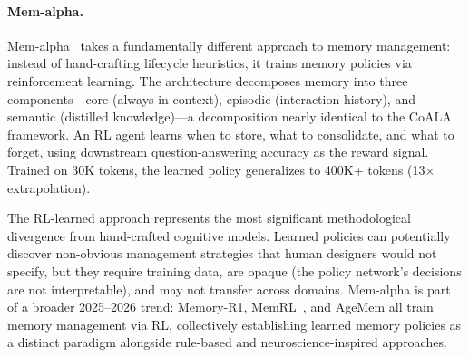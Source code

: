\paragraph{Mem-alpha.}
Mem-alpha~\cite{wang2025memalpha} takes a fundamentally different
approach to memory management: instead of hand-crafting lifecycle
heuristics, it trains memory policies via reinforcement learning.
The architecture decomposes memory into three components---core
(always in context), episodic (interaction history), and semantic
(distilled knowledge)---a decomposition nearly identical to the CoALA
framework. An RL agent learns when to store, what to consolidate,
and what to forget, using downstream question-answering accuracy as
the reward signal. Trained on 30K tokens, the learned policy
generalizes to 400K+ tokens (13$\times$ extrapolation).

The RL-learned approach represents the most significant methodological
divergence from hand-crafted cognitive models. Learned policies can
potentially discover non-obvious management strategies that human
designers would not specify, but they require training data, are
opaque (the policy network's decisions are not interpretable), and may
not transfer across domains. Mem-alpha is part of a broader 2025--2026
trend: Memory-R1, MemRL~\cite{zhang2026memrl}, and AgeMem all train
memory management via RL, collectively establishing learned memory
policies as a distinct paradigm alongside rule-based and
neuroscience-inspired approaches.
